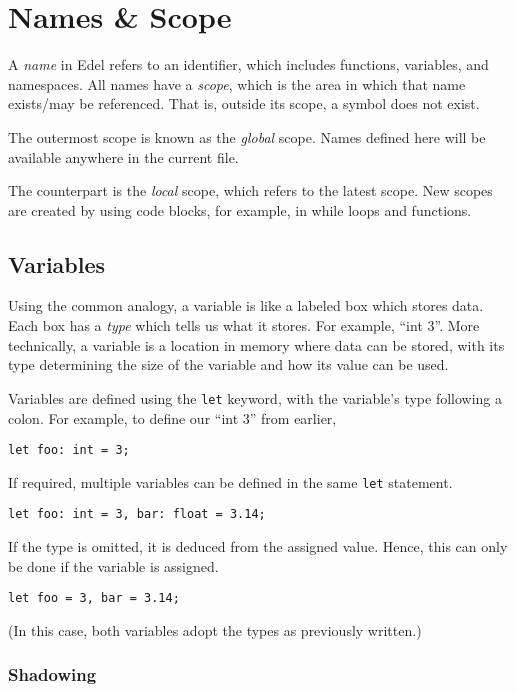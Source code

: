 \section{Names \& Scope}\label{sec:names-&-scope}

A \textit{name} in Edel refers to an identifier, which includes functions, variables, and namespaces.
All names have a \textit{scope}, which is the area in which that name exists/may be referenced.
That is, outside its scope, a symbol does not exist.

The outermost scope is known as the \textit{global} scope.
Names defined here will be available anywhere in the current file.

The counterpart is the \textit{local} scope, which refers to the latest scope.
New scopes are created by using code blocks, for example, in while loops and functions.

\subsection{Variables}\label{subsec:variables}

Using the common analogy, a variable is like a labeled box which stores data.
Each box has a \textit{type} which tells us what it stores.
For example, ``int 3''.
More technically, a variable is a location in memory where data can be stored, with its type determining the size of the variable and how its value can be used.

Variables are defined using the \texttt{let} keyword, with the variable's type following a colon.
For example, to define our ``int 3'' from earlier,
\begin{lstlisting}[language=CustomLang]
let foo: int = 3;
\end{lstlisting}

If required, multiple variables can be defined in the same \texttt{let} statement.
\begin{lstlisting}[language=CustomLang]
let foo: int = 3, bar: float = 3.14;
\end{lstlisting}

If the type is omitted, it is deduced from the assigned value.
Hence, this can only be done if the variable is assigned.
\begin{lstlisting}[language=CustomLang]
let foo = 3, bar = 3.14;
\end{lstlisting}
(In this case, both variables adopt the types as previously written.)

\subsubsection{Shadowing}

